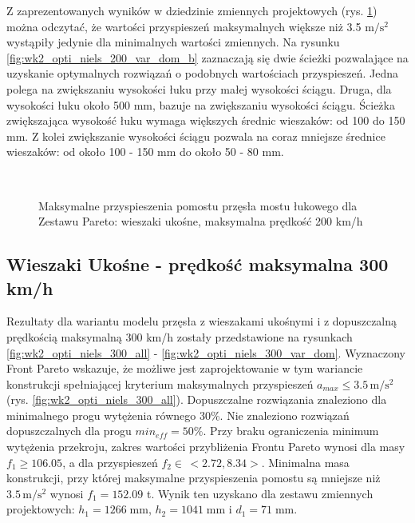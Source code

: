 
Z zaprezentowanych wyników w dziedzinie zmiennych projektowych (rys. \ref{fig:wk2_opti_niels_200_var_dom}) można odczytać, że wartości przyspieszeń maksymalnych większe niż 3.5 $\mathrm{m/s^2}$ wystąpiły jedynie dla minimalnych wartości zmiennych. Na rysunku \ref{fig:wk2_opti_niels_200_var_dom_b} zaznaczają się dwie ścieżki pozwalające na uzyskanie optymalnych rozwiązań o podobnych wartościach przyspieszeń. Jedna polega na zwiększaniu wysokości łuku przy małej wysokości ściągu. Druga, dla wysokości łuku około 500 mm, bazuje na zwiększaniu wysokości ściągu. Ścieżka zwiększająca wysokość łuku wymaga większych średnic wieszaków: od 100 do 150 mm. Z kolei zwiększanie wysokości ściągu pozwala na coraz mniejsze średnice wieszaków: od około 100 - 150 mm do około 50 - 80 mm.

\begin{figure}[hbt!]
	\centering
	\\
	\captionsetup{justification=centering}
	\caption{Maksymalne przyspieszenia pomostu przęsła mostu łukowego dla Zestawu Pareto: wieszaki ukośne, maksymalna prędkość 200 km/h}
	\label{fig:wk2_opti_niels_200_var_dom}
\end{figure}





\pagebreak[4]
\subsection{Wieszaki Ukośne - prędkość maksymalna 300 km/h}


Rezultaty dla wariantu modelu przęsła z wieszakami ukośnymi i z dopuszczalną prędkością maksymalną 300 km/h zostały przedstawione na rysunkach \ref{fig:wk2_opti_niels_300_all} - \ref{fig:wk2_opti_niels_300_var_dom}. Wyznaczony Front Pareto wskazuje, że możliwe jest zaprojektowanie w tym wariancie konstrukcji spełniającej kryterium maksymalnych przyspieszeń $a_{max}\le 3.5\,\mathrm{m/s^2}$ (rys. \ref{fig:wk2_opti_niels_300_all}). 
Dopuszczalne rozwiązania znaleziono dla minimalnego progu wytężenia równego 30\%. Nie znaleziono rozwiązań dopuszczalnych dla progu $min_{eff}=50\%$. Przy braku ograniczenia minimum wytężenia przekroju, zakres wartości przybliżenia Frontu Pareto wynosi dla masy $f_1 \ge 106.05$, a dla przyspieszeń $f_2 \in\,<2.72,8.34>$. Minimalna masa konstrukcji, przy której maksymalne przyspieszenia pomostu są mniejsze niż $3.5\,\mathrm{m/s^2}$ wynosi $f_1 = 152.09$ t. Wynik ten uzyskano dla zestawu zmiennych projektowych: $h_1 = 1266\;\mathrm{mm}$, $h_2 = 1041\;\mathrm{mm}$ i $d_1 = 71\;\mathrm{mm}$.

